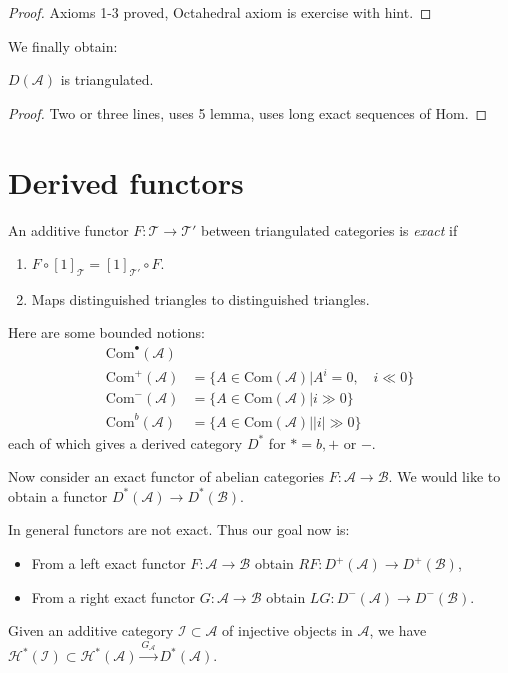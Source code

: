 \begin{proof}
Axioms 1-3 proved, Octahedral axiom is exercise with hint.
\end{proof}

We finally obtain:

\begin{lemma}
\label{lemma-derived-category-is-triangulated}
$D(\mathcal{A})$ is triangulated.
\end{lemma}

\begin{proof}
Two or three lines, uses 5 lemma, uses long exact sequences of $\text{Hom}$.
\end{proof}

\section{Derived functors}
\label{subsection-derived-functors}

\begin{definition}
\label{definition-additive-exact-functor}
An additive functor $F:\mathcal{T} \to \mathcal{T}'$ between triangulated
categories is {\it exact} if
\begin{enumerate}
\item $F \circ [1]_{\mathcal{T}}=[1]_{\mathcal{T}'}\circ F$.
\item Maps distinguished triangles to distinguished triangles.
\end{enumerate}
\end{definition}

\medskip\noindent
Here are some bounded notions:
\begin{align*}
\text{Com}^\bullet(\mathcal{A})&\\
\text{Com}^+(\mathcal{A})&=\{A\in \text{Com}(\mathcal{A})
|A^i=0,\quad i\ll 0\}\\
\text{Com}^-(\mathcal{A})&=\{A\in \text{Com}(\mathcal{A})|i \gg 0\}\\
\text{Com}^b(\mathcal{A})&=\{A \in \text{Com}(\mathcal{A})||i|\gg 0\}
\end{align*}
each of which gives a derived category $D^*$ for $*=b,+$ or $-$.

Now consider an exact functor of abelian categories $F:\mathcal{A} \to
\mathcal{B}$. We would like to obtain a functor
$D^*(\mathcal{A}) \to D^*(\mathcal{B})$.

In general functors are not exact. Thus our goal now is:
\begin{itemize}
\item From a left exact functor $F:\mathcal{A} \to \mathcal{B}$ obtain
$RF:D^+(\mathcal{A})\to D^+(\mathcal{B})$,
\item From a right exact functor $G:\mathcal{A}\to \mathcal{B}$ obtain
$LG:D^-(\mathcal{A})\to D^-(\mathcal{B})$.
\end{itemize}
Given an additive category $\mathcal{I} \subset \mathcal{A}$ of injective
objects in $\mathcal{A}$, we have  $\mathcal{H}^* (\mathcal{I})\subset 
\mathcal{H}^* (\mathcal{A}) \xrightarrow{G_{\mathcal{A}}}D^*(\mathcal{A})$.

